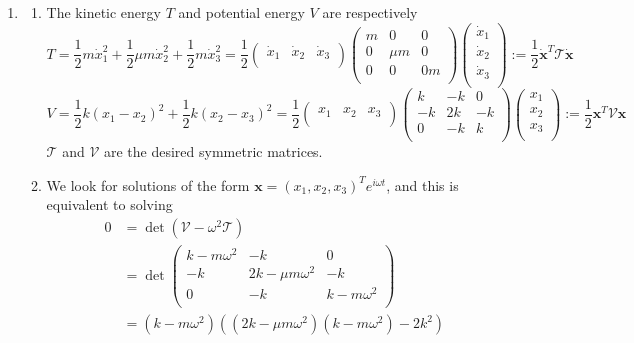 \documentclass[a4paper]{article}
\begin{document}
\begin{ans}\leavevmode
\begin{enumerate}[label=(\alph*)]
\item
\begin{enumerate}[label=(\roman*)]
\item The kinetic energy $T$ and potential energy $V$ are respectively
$$T=\frac{1}{2}m\dot{x}_1^2+\frac{1}{2}\mu m\dot{x}_2^2+\frac{1}{2}m\dot{x}_3^2=\frac{1}{2}\begin{pmatrix}\dot{x}_1&\dot{x}_2&\dot{x}_3\\\end{pmatrix}\begin{pmatrix}m&0&0\\0&\mu m&0\\0&0&0m\\\end{pmatrix}\begin{pmatrix}\dot{x}_1\\\dot{x}_2\\\dot{x}_3\\\end{pmatrix}:=\frac{1}{2}\mathbf{\dot{x}}^T\mathcal{T}\mathbf{\dot{x}}$$
$$V=\frac{1}{2}k(x_1-x_2)^2+\frac{1}{2}k(x_2-x_3)^2=\frac{1}{2}\begin{pmatrix}x_1&x_2&x_3\\\end{pmatrix}\begin{pmatrix}k&-k&0\\-k&2k&-k\\0&-k&k\\\end{pmatrix}\begin{pmatrix}x_1\\x_2\\x_3\\\end{pmatrix}:=\frac{1}{2}\mathbf{x}^T\mathcal{V}\mathbf{x}$$
$\mathcal{T}$ and $\mathcal{V}$ are the desired symmetric matrices.
\item We look for solutions of the form $\mathbf{x}=(x_1,x_2,x_3)^Te^{i\omega t}$, and this is equivalent to solving
\begin{align}
0&=\det(\mathcal{V}-\omega^2\mathcal{T})\nonumber\\&=\det\begin{pmatrix}k-m\omega^2&-k&0\\-k&2k-\mu m\omega^2&-k\\0&-k&k-m\omega^2\\\end{pmatrix}\nonumber\\&=(k-m\omega^2)((2k-\mu m\omega^2)(k-m\omega^2)-2k^2)\nonumber

\end{align}
\end{enumerate}
\end{enumerate}
\end{ans}
\end{document}

